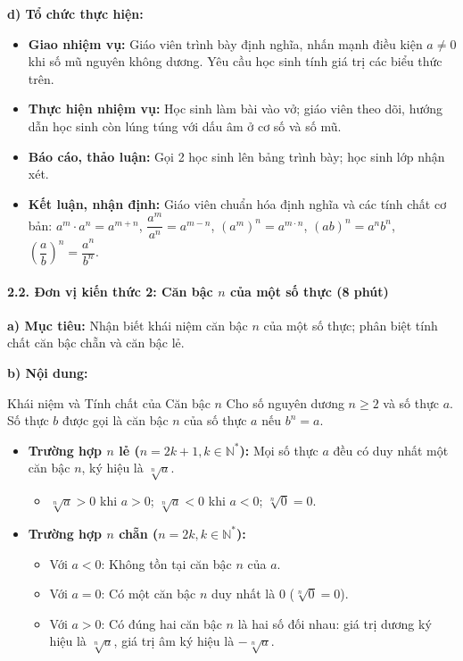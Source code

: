 \documentclass[12pt, a4paper]{article}
\begin{document}
\noindent \textbf{d) Tổ chức thực hiện:}
\begin{itemize}[leftmargin=0.6cm]
    \item \textbf{Giao nhiệm vụ:} Giáo viên trình bày định nghĩa, nhấn mạnh điều kiện $a \neq 0$ khi số mũ nguyên không dương. Yêu cầu học sinh tính giá trị các biểu thức trên.
    \item \textbf{Thực hiện nhiệm vụ:} Học sinh làm bài vào vở; giáo viên theo dõi, hướng dẫn học sinh còn lúng túng với dấu âm ở cơ số và số mũ.
    \item \textbf{Báo cáo, thảo luận:} Gọi 2 học sinh lên bảng trình bày; học sinh lớp nhận xét.
    \item \textbf{Kết luận, nhận định:} Giáo viên chuẩn hóa định nghĩa và các tính chất cơ bản: $a^m \cdot a^n = a^{m+n}$, $\dfrac{a^m}{a^n} = a^{m-n}$, $(a^m)^n = a^{m \cdot n}$, $(ab)^n = a^n b^n$, $\left(\dfrac{a}{b}\right)^n = \dfrac{a^n}{b^n}$.
\end{itemize}

\paragraph{2.2. Đơn vị kiến thức 2: Căn bậc $n$ của một số thực (8 phút)}

\noindent \textbf{a) Mục tiêu:}
Nhận biết khái niệm căn bậc $n$ của một số thực; phân biệt tính chất căn bậc chẵn và căn bậc lẻ.

\noindent \textbf{b) Nội dung:}
\begin{pedabox}{Khái niệm và Tính chất của Căn bậc $n$}
Cho số nguyên dương $n \ge 2$ và số thực $a$. Số thực $b$ được gọi là căn bậc $n$ của số thực $a$ nếu $b^n = a$.
\begin{itemize}[leftmargin=0.6cm]
    \item \textbf{Trường hợp $n$ lẻ ($n = 2k + 1, k \in \mathbb{N}^*$):} Mọi số thực $a$ đều có duy nhất một căn bậc $n$, ký hiệu là $\sqrt[n]{a}$.
    \begin{itemize}
        \item $\sqrt[n]{a} > 0$ khi $a > 0$; $\sqrt[n]{a} < 0$ khi $a < 0$; $\sqrt[n]{0} = 0$.
    \end{itemize}
    \item \textbf{Trường hợp $n$ chẵn ($n = 2k, k \in \mathbb{N}^*$):}
    \begin{itemize}
        \item Với $a < 0$: Không tồn tại căn bậc $n$ của $a$.
        \item Với $a = 0$: Có một căn bậc $n$ duy nhất là $0$ ($\sqrt[n]{0} = 0$).
        \item Với $a > 0$: Có đúng hai căn bậc $n$ là hai số đối nhau: giá trị dương ký hiệu là $\sqrt[n]{a}$, giá trị âm ký hiệu là $-\sqrt[n]{a}$.
    \end{itemize}
\end{itemize}
\end{pedabox}
\end{document}
